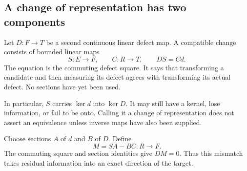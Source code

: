 \subsection{A change of representation has two components}
Let \(D:F\to T\) be a second continuous linear defect map. A compatible change consists of bounded linear maps
\[
 S:E\to F,\qquad C:R\to T,\qquad DS=Cd.
\]
The equation is the commuting defect square. It says that transforming a candidate and then measuring its defect agrees with transforming its actual defect. No sections have yet been used.

In particular, \(S\) carries \(\ker d\) into \(\ker D\). It may still have a kernel, lose information, or fail to be onto. Calling it a change of representation does not assert an equivalence unless inverse maps have also been supplied.

Choose sections \(A\) of \(d\) and \(B\) of \(D\). Define
\begin{equation}\label{eq:repair-mismatch}
 M=SA-BC:R\longrightarrow F.
\end{equation}
The commuting square and section identities give \(DM=0\). Thus this mismatch takes residual information into an exact direction of the target.

